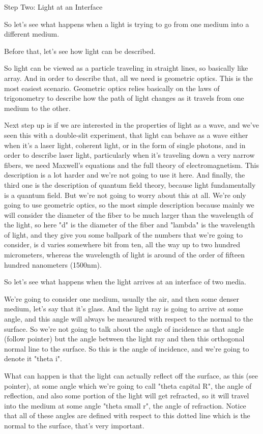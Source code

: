 Step Two: Light at an Interface

So let's see what happens when a light is trying to go from one medium into a different medium.

Before that, let's see how light can be described.

So light can be viewed as a particle traveling in straight lines, so basically like array. And in order to describe that, all we need is geometric optics. This is the most easiest scenario. Geometric optics relies basically on the laws of trigonometry to describe how the path of light changes as it travels from one medium to the other.

Next step up is if we are interested in the properties of light as a wave, and we've seen this with a double-slit experiment, that light can behave as a wave either when it's a laser light, coherent light, or in the form of single photons, and in order to describe laser light, particularly when it's traveling down a very narrow fibers, we need Maxwell's equations and the full theory of electromagnetism. This description is a lot harder and we're not going to use it here. And finally, the third one is the description of quantum field theory, because light fundamentally is a quantum field. But we're not going to worry about this at all. We're only going to use geometric optics, so the most simple description because mainly we will consider the diameter of the fiber to be much larger than the wavelength of the light, so here "d" is the diameter of the fiber and "lambda" is the wavelength of light, and they give you some ballpark of the numbers that we're going to consider, is d varies somewhere bit from ten, all the way up to two hundred micrometers, whereas the wavelength of light is around of the order of fifteen hundred nanometers (1500nm).

So let's see what happens when the light arrives at an interface of two media.

We're going to consider one medium, usually the air, and then some denser medium, let's say that it's glass. And the light ray is going to arrive at some angle, and this angle will always be measured with respect to the normal to the surface. So we're not going to talk about the angle of incidence as that angle (follow pointer) but the angle between the light ray and then this orthogonal normal line to the surface. So this is the angle of incidence, and we're going to denote it "theta i".

What can happen is that the light can actually reflect off the surface, as this (see pointer), at some angle which we're going to call "theta capital R", the angle of reflection, and also some portion of the light will get refracted, so it will travel into the medium at some angle "theta small r", the angle of refraction. Notice that all of these angles are defined with respect to this dotted line which is the normal to the surface, that's very important.


